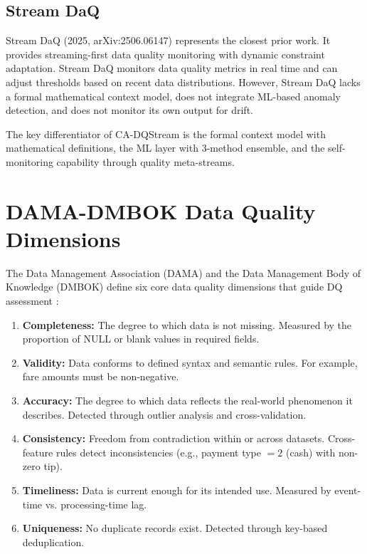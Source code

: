 \subsection{Stream DaQ}

Stream DaQ \citep{papastergios2025stream} (2025, arXiv:2506.06147) represents the closest prior work. It provides streaming-first data quality monitoring with dynamic constraint adaptation. Stream DaQ monitors data quality metrics in real time and can adjust thresholds based on recent data distributions. However, Stream DaQ lacks a formal mathematical context model, does not integrate ML-based anomaly detection, and does not monitor its own output for drift.

The key differentiator of CA-DQStream is the formal context model with mathematical definitions, the ML layer with 3-method ensemble, and the self-monitoring capability through quality meta-streams.

\section{DAMA-DMBOK Data Quality Dimensions}

The Data Management Association (DAMA) and the Data Management Body of Knowledge (DMBOK) define six core data quality dimensions that guide DQ assessment \citep{dama2017dmbok}:

\begin{enumerate}
    \item \textbf{Completeness:} The degree to which data is not missing. Measured by the proportion of NULL or blank values in required fields.
    \item \textbf{Validity:} Data conforms to defined syntax and semantic rules. For example, fare amounts must be non-negative.
    \item \textbf{Accuracy:} The degree to which data reflects the real-world phenomenon it describes. Detected through outlier analysis and cross-validation.
    \item \textbf{Consistency:} Freedom from contradiction within or across datasets. Cross-feature rules detect inconsistencies (e.g., payment type $=2$ (cash) with non-zero tip).
    \item \textbf{Timeliness:} Data is current enough for its intended use. Measured by event-time vs. processing-time lag.
    \item \textbf{Uniqueness:} No duplicate records exist. Detected through key-based deduplication.
\end{enumerate}

